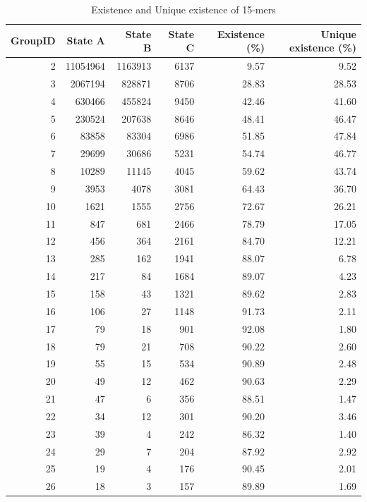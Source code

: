 \documentclass[11pt]{article}
\begin{document}
\begin{longtable}{r|r|r|r|r|r}
\caption{Existence and Unique existence of 15-mers}\\
\toprule
\textbf{GroupID} & \textbf{State A} & \textbf{State B} & \textbf{State C} & \textbf{Existence (\%)} & \textbf{Unique existence (\%)}\\
\midrule
\endhead
    2     & 11054964 & 1163913 & 6137  & 9.57 & 9.52 \\
    3     & 2067194 & 828871 & 8706  & 28.83 & 28.53 \\
    4     & 630466 & 455824 & 9450  & 42.46 & 41.60 \\
    5     & 230524 & 207638 & 8646  & 48.41 & 46.47 \\
    6     & 83858 & 83304 & 6986  & 51.85 & 47.84 \\
    7     & 29699 & 30686 & 5231  & 54.74 & 46.77 \\
    8     & 10289 & 11145 & 4045  & 59.62 & 43.74 \\
    9     & 3953  & 4078  & 3081  & 64.43 & 36.70 \\
    10    & 1621  & 1555  & 2756  & 72.67 & 26.21 \\
    11    & 847   & 681   & 2466  & 78.79 & 17.05 \\
    12    & 456   & 364   & 2161  & 84.70 & 12.21 \\
    13    & 285   & 162   & 1941  & 88.07 & 6.78 \\
    14    & 217   & 84    & 1684  & 89.07 & 4.23 \\
    15    & 158   & 43    & 1321  & 89.62 & 2.83 \\
    16    & 106   & 27    & 1148  & 91.73 & 2.11 \\
    17    & 79    & 18    & 901   & 92.08 & 1.80 \\
    18    & 79    & 21    & 708   & 90.22 & 2.60 \\
    19    & 55    & 15    & 534   & 90.89 & 2.48 \\
    20    & 49    & 12    & 462   & 90.63 & 2.29 \\
    21    & 47    & 6     & 356   & 88.51 & 1.47 \\
    22    & 34    & 12    & 301   & 90.20 & 3.46 \\
    23    & 39    & 4     & 242   & 86.32 & 1.40 \\
    24    & 29    & 7     & 204   & 87.92 & 2.92 \\
    25    & 19    & 4     & 176   & 90.45 & 2.01 \\
    26    & 18    & 3     & 157   & 89.89 & 1.69 \\

\end{longtable}
\end{document}
